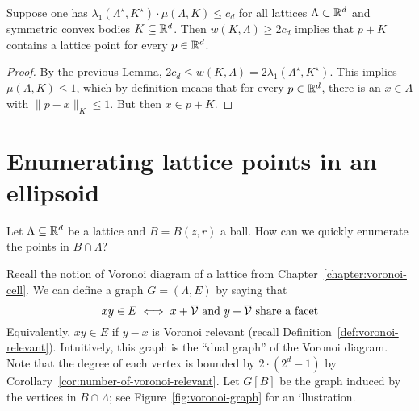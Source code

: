 \begin{lemma}
  Suppose one has $\lambda_1(\Lambda^\star, K^\star) \cdot \mu(\Lambda, K) \leq c_d$
  for all lattices $\Lambda \subset \mathbb{R}^d$ and symmetric convex bodies $K \subseteq \mathbb{R}^d$.
  Then $w(K,\Lambda) \geq 2c_d$ implies that $p + K$ contains a lattice point for every $p \in \mathbb{R}^d$.
\end{lemma}
\begin{proof}
  By the previous Lemma, $2c_d \leq w(K,\Lambda) = 2 \lambda_1(\Lambda^\star, K^\star)$.
  This implies $\mu(\Lambda, K) \leq 1$,
  which by definition means that for every $p \in \mathbb{R}^d$,
  there is an $x \in \Lambda$ with $\|p - x\|_K \leq 1$.
  But then $x \in p + K$.
\end{proof}





\section{Enumerating lattice points in an ellipsoid}

Let $\Lambda \subseteq \mathbb{R}^d$ be a lattice and $B = B(z,r)$ a ball.
How can we quickly enumerate the points in $B \cap \Lambda$?

Recall the notion of Voronoi diagram of a lattice from Chapter~\ref{chapter:voronoi-cell}.
We can define a graph $G = (\Lambda, E)$ by saying that
\[
  xy \in E \iff x + \overline{\mathcal{V}} \text{ and } y + \overline{\mathcal{V}} \text{ share a facet}
\]
Equivalently, $xy \in E$ if $y - x$ is Voronoi relevant
(recall Definition~\ref{def:voronoi-relevant}).
Intuitively, this graph is the ``dual graph'' of the Voronoi diagram.
Note that the degree of each vertex is bounded by $2\cdot (2^d - 1)$
by Corollary~\ref{cor:number-of-voronoi-relevant}.
Let $G[B]$ be the graph induced by the vertices in $B \cap \Lambda$;
see Figure~\ref{fig:voronoi-graph} for an illustration.

